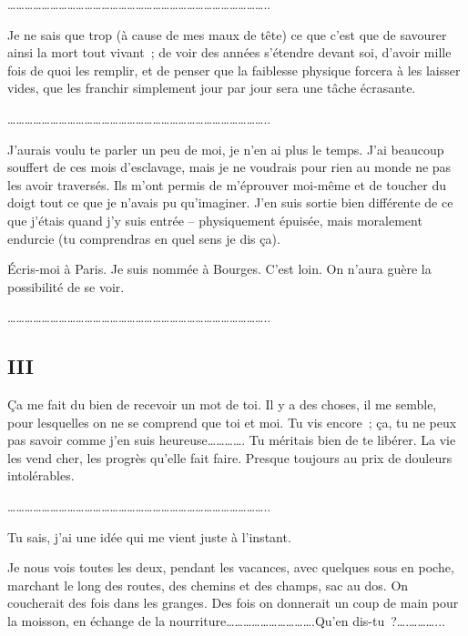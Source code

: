 \documentclass[french,twoside]{book} %
\newcommand{\salute}[1]{\bigbreak{#1}\par\medbreak}
\newcommand{\signed}[1]{\bigbreak\filbreak{\raggedleft #1\par}\medskip}
\begin{document}
\begin{center}
………………………………………………………………………………..\end{center}
\noindent Je ne sais que trop (à cause de mes maux de tête) ce que c'est que de savourer ainsi la mort tout vivant ; de voir des années s'étendre devant soi, d'avoir mille fois de quoi les remplir, et de penser que la faiblesse physique forcera à les laisser vides, que les franchir simplement jour par jour sera une tâche écrasante.\par

\begin{center}
………………………………………………………………………………..\end{center}
\noindent J'aurais voulu te parler un peu de moi, je n'en ai plus le temps. J'ai beaucoup souffert de ces mois d'esclavage, mais je ne voudrais pour rien au monde ne pas les avoir traversés. Ils m'ont permis de m'éprouver moi-même et de toucher du doigt tout ce que je n'avais pu qu'imaginer. J'en suis sortie bien différente de ce que j'étais quand j'y suis entrée – physiquement épuisée, mais moralement endurcie (tu comprendras en quel sens je dis ça).\par
Écris-moi à Paris. Je suis nommée à Bourges. C'est loin. On n'aura guère la possibilité de se voir.\par

\begin{center}
………………………………………………………………………………..\end{center}

\salute{Je t'embrasse.}


\signed{SIMONE.}
\subsection[III]{III}

\salute{Chère Albertine,}
\noindent Ça me fait du bien de recevoir un mot de toi. Il y a des choses, il me semble, pour lesquelles on ne se comprend que toi et moi. Tu vis encore ; ça, tu ne peux pas savoir comme j'en suis heureuse…………. Tu méritais bien de te libérer. La vie les vend cher, les progrès qu'elle fait faire. Presque toujours au prix de douleurs intolérables.\par

\begin{center}
………………………………………………………………………………..\end{center}
\noindent Tu sais, j'ai une idée qui me vient juste à l'instant.\par
Je nous vois toutes les deux, pendant les vacances, avec quelques sous en poche, marchant le long des routes, des chemins et des champs, sac au dos. On coucherait des fois dans les granges. Des fois on donnerait un coup de main pour la moisson, en échange de la nourriture………………………….Qu'en dis-tu ?….………...\par
\end{document}
